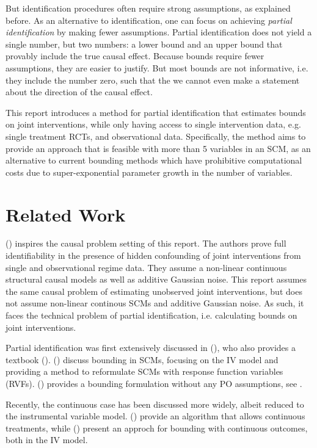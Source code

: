 \documentclass{article}
\begin{document}
But identification procedures often require strong assumptions, as explained before. As an alternative to identification, one can focus on achieving \textit{partial identification} by making fewer assumptions. Partial identification does not yield a single number, but two numbers: a lower bound and an upper bound that provably include the true causal effect. Because bounds require fewer assumptions, they are easier to justify. But most bounds are not informative, i.e. they include the number zero, such that the we cannot even make a statement about the direction of the causal effect. 

This report introduces a method for partial identification that estimates bounds on joint interventions, while only having access to single intervention data, e.g. single treatment RCTs, and observational data. Specifically, the method aims to provide an approach that is feasible with more than 5 variables in an SCM, as an alternative to current bounding methods which have prohibitive computational costs due to super-exponential parameter growth in the number of variables.

\section{Related Work}
\label{sec:related_work}

(\cite{saengkyongam2020learning}) inspires the causal problem setting of this report. The authors prove full identifiability in the presence of hidden confounding of joint interventions from single and observational regime data. They assume a non-linear continuous structural causal models as well as additive Gaussian noise. This report assumes the same causal problem of estimating unobserved joint interventions, but does not assume non-linear continous SCMs and additive Gaussian noise. As such, it faces the technical problem of partial identification, i.e. calculating bounds on joint interventions.

Partial identification was first extensively discussed in (\cite{manski1990nonparametric}), who also provides a textbook (\cite{manski2003partial}). (\cite{balke1994}) discuss bounding in SCMs, focusing on the IV model and providing a method to reformulate SCMs with response function variables (RVFs). (\cite{ramsahai2012causal}) provides a bounding formulation without any PO assumptions, see . 

Recently, the continuous case has been discussed more widely, albeit reduced to the instrumental variable model. (\cite{kilbertus2020class}) provide an algorithm that allows continuous treatments, while (\cite{zhang2021bounding}) present an approch for bounding with continuous outcomes, both in the IV model.
\end{document}
